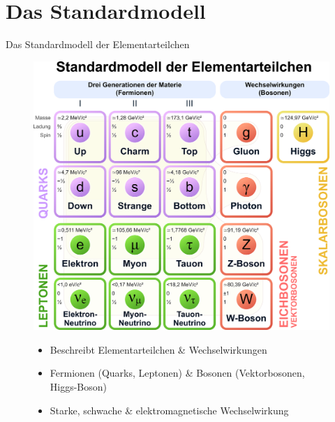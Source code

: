 \documentclass[aspectratio=169]{beamer} %
\begin{document}
    \section{Das Standardmodell}
    \begin{frame}{Das Standardmodell der Elementarteilchen}
      \begin{figure}
        \centering
        \begin{minipage}{0.5\textwidth}
          \centering
          \includegraphics[width=\textwidth, keepaspectratio, height=0.85\textheight]{Standard_Model_of_Elementary_Particles_normal.png}\tiny
          \\\end{minipage}
        \hfill \pause
        \begin{minipage}{0.48\textwidth}
          \begin{itemize}
            \item Beschreibt Elementarteilchen \& Wechselwirkungen \pause
            \item Fermionen (Quarks, Leptonen) \& Bosonen (Vektorbosonen, Higgs-Boson) \pause
            \item Starke, schwache \& elektromagnetische Wechselwirkung
          \end{itemize}
          \end{minipage}
      \end{figure}
    \end{frame}
\end{document}
